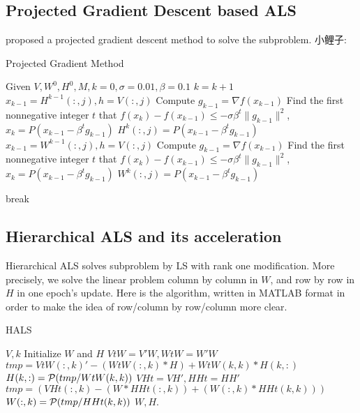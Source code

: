 \documentclass{article}
\begin{document}
\subsection{Projected Gradient Descent based ALS}
\cite{alspgd} proposed a projected gradient descent method to solve the subproblem. 
小鲤子:

\begin{algorithm}[htp]
	\caption{Projected Gradient Method}%
	\begin{algorithmic}[1]%
		\STATE Given $V,W^0,H^0,M,k=0,\sigma = 0.01, \beta = 0.1$ 
		\STATE $k = k + 1$
		\STATE $x_{k-1} = H^{k-1}(:,j), h = V(:,j)$
		\STATE Compute $g_{k-1} = \nabla f(x_{k-1})$
		\STATE Find the first nonnegative integer $t$ that $f(x_{k}) - f(x_{k-1})\leq -\sigma \beta^t \|g_{k-1}\|^2$,$x_{k} = P(x_{k-1} - \beta^t g_{k-1})$
		\STATE $H^k(:,j) = P(x_{k-1} - \beta^t g_{k-1})$  
		\ENDFOR
		\STATE $x_{k-1} = W^{k-1}(:,j), h = V(:,j)$
		\STATE Compute $g_{k-1} = \nabla f(x_{k-1})$
		\STATE Find the first nonnegative integer $t$ that $f(x_{k}) - f(x_{k-1})\leq -\sigma \beta^t \|g_{k-1}\|^2$,$x_{k} = P(x_{k-1} - \beta^t g_{k-1})$
		\STATE $W^k(:,j) = P(x_{k-1} - \beta^t g_{k-1})$  
		\ENDFOR		
		
		\STATE break
		\ENDIF
		\ENDWHILE
	\end{algorithmic}
\end{algorithm}


\subsection{Hierarchical ALS and its acceleration}
Hierarchical  ALS \cite{hals} solves subproblem by LS with rank one modification. More precisely, we solve the linear problem column by column in $W$, and row by row in $H$ in one epoch's update. Here is  the algorithm, written in MATLAB format in order to make the idea of row/column by row/column more clear.

\begin{algorithm}[H]
	\caption{HALS}
	\begin{algorithmic}[1]
		\REQUIRE $V, k$
		\STATE Initialize $W$ and $H$ 
		\STATE $VtW = V'W, WtW = W'W$
		\STATE $tmp = VtW(:,k)' - (WtW(:,k) * H) + WtW(k,k)*H(k,:)$
		\STATE $H(k,:) = \P(tmp/WtW(k,k))$
		\ENDFOR
				\STATE $VHt = VH', HHt = HH'$
		\STATE $tmp = (VHt(:,k) - (W * HHt(:,k)) + (W(:,k)* HHt(k,k)))$
		\STATE $W(:,k) = \P(tmp/HHt(k,k))$
		\ENDFOR
		\ENDWHILE
		\STATE \Return $W,H$.
	\end{algorithmic}
\end{algorithm}
\end{document}

